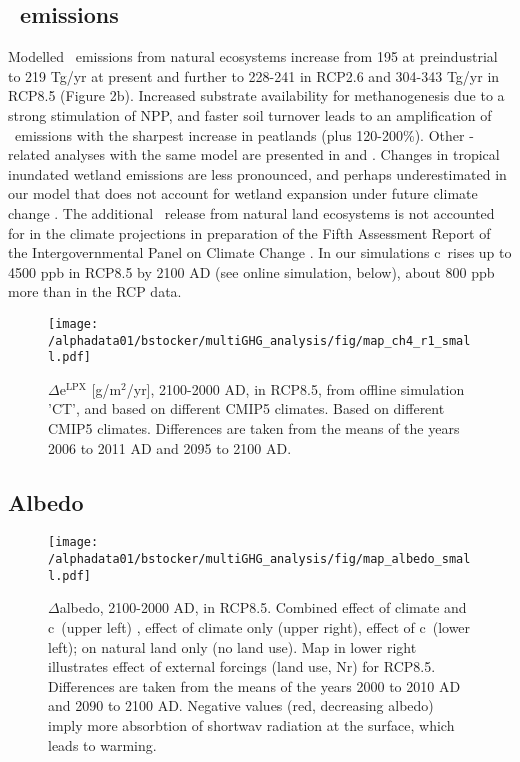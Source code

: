 \subsection{\chh\ emissions}
\label{sec:eCH4}
Modelled \chh\ emissions from natural ecosystems increase from 195 at preindustrial to 219 Tg\chh /yr at present and further to 228-241 in RCP2.6 and 304-343 Tg\chh /yr in RCP8.5 (Figure 2b). Increased substrate availability for methanogenesis due to a strong stimulation of NPP, and faster soil turnover leads to an amplification of \chh\ emissions with the sharpest increase in peatlands (plus 120-200\%). Other \chh -related analyses with the same model are presented in \citet{spahni11bg} and \citet{zuercher12bgd}. Changes in tropical inundated wetland emissions are less pronounced, and perhaps underestimated in our model that does not account for wetland expansion under future climate change \citep{shindell04grl,melton12bgd}. The additional \chh\ release from natural land ecosystems is not accounted for in the climate projections in preparation of the Fifth Assessment Report of the Intergovernmental Panel on Climate Change \cite{RCPdatabase, CMIP5}. In our simulations c\chh\ rises up to 4500 ppb in RCP8.5 by 2100 AD (see online simulation, below), about 800 ppb more than in the RCP data.

\begin{figure}[ht!]
\begin{center}
  \texttt{[image: /alphadata01/bstocker/multiGHG\_analysis/fig/map\_ch4\_r1\_small.pdf]}
\end{center}
\caption[Maps of future \chh\ emission change for different climate change patterns (RCP8.5)]{$\Delta$e\chh$^{\mathrm{LPX}}$ [g\chh/m$^2$/yr], 2100-2000 AD, in RCP8.5, from offline simulation 'CT', and based on different CMIP5 climates. Based on different CMIP5 climates. Differences are taken from the means of the years 2006 to 2011 AD and 2095 to 2100 AD.}
\label{fig:deCH4}
\end{figure}
\clearpage

\subsection{Albedo}
\label{sec:alb}
\begin{figure}[ht!]
\begin{center}
  \texttt{[image: /alphadata01/bstocker/multiGHG\_analysis/fig/map\_albedo\_small.pdf]}
\end{center}
\caption[Maps of future albedo change, separated by effects from land use change, climate, and \coo\ (RCP8.5)]{$\Delta$albedo, 2100-2000 AD, in RCP8.5. Combined effect of climate and c\coo\ (upper left) , effect of climate only (upper right), effect of c\coo\ (lower left); on natural land only (no land use). Map in lower right illustrates effect of external forcings (land use, Nr) for RCP8.5. Differences are taken from the means of the years 2000 to 2010 AD and 2090 to 2100 AD. Negative values (red, decreasing albedo) imply more absorbtion of shortwav radiation at the surface, which leads to warming.}
\label{fig:albedo}
\end{figure}


